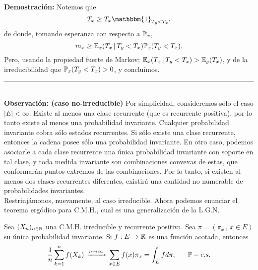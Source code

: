 \textbf{Demostración: }Notemos que
\[T_x \geq T_x\mathbbm{1}_{T_y<T_x},\]
de donde, tomando esperanza con respecto a $\mathbb{P}_x$,
\[m_x \geq \mathbb E_x(T_x\,|\,T_y<T_x)\mathbb{P}_x(T_y<T_x).\]
Pero, usando la propiedad fuerte de Markov; $\mathbb E_x(T_x\,|\,T_y<T_x) > \mathbb E_y(T_x)$, y de la irreducibilidad que $\mathbb{P}_x(T_y<T_x) >0$, y concluímos.\\
\rule{0.7em}{0.7em}\\ \newline
\textbf{Observación: (caso no-irreducible)} Por simplicidad, consideremos sólo el caso $|E|<\infty$. Existe al menos una clase recurrente (que es recurrente positiva), por lo tanto existe al menos una probabilidad invariante. Cualquier probabilidad invariante cobra sólo estados recurrentes. Si sólo existe una clase recurrente, entonces la cadena posee sólo una probabilidad invariante. En otro caso, podemos asociarle a cada clase recurrente una única probabilidad invariante  con soporte en tal clase, y toda medida invariante son combinaciones convexas de estas, que conformarán puntos extremos de las combinaciones. Por lo tanto, si existen al menos dos clases recurrentes diferentes, existirá una cantidad no numerable de probabilidades invariantes.\\ \newline
Restrinjámonos, nuevamente, al caso irreducible. Ahora podemos enunciar el teorema ergódico para C.M.H., cual es una generalización de la L.G.N.

\begin{teorema}
Sea $(X_n)_{n\in\mathbb N}$ una C.M.H. irreducible y recurrente positiva. Sea $\pi = (\pi_x\,,\,x\in E)$ su única probabilidad invariante. Si $f:E\rightarrow \mathbb R$ es una función acotada, entonces
\[\frac{1}{n}\sum_{k=1}^n f(X_k)\, \xrightarrow{n\rightarrow \infty}\,\sum_{x\in E}f(x)\pi_x = \int_E f d\pi,\hspace{0.6cm}\mathbb{P}-c.s.\]
\end{teorema}

